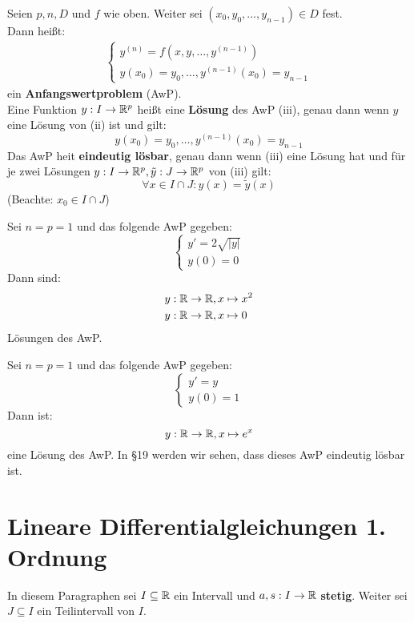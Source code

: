 \documentclass[a4paper,twoside,DIV15,BCOR12mm,chapterprefix=true,headings=twolinechapter]{scrbook}
\begin{document}
\begin{definition}
Seien $p,n,D$ und $f$ wie oben. Weiter sei $(x_0,y_0,\ldots,y_{n-1})\in D$ fest.\\
Dann heißt:
\begin{align*}
\begin{cases}y^{(n)}=f(x,y,\ldots,y^{(n-1)})\\
y(x_0)=y_0,\ldots,y^{(n-1)}(x_0)=y_{n-1}\end{cases}\tag{iii}
\end{align*}
ein \textbf{Anfangswertproblem} (AwP).\\
Eine Funktion $y:I\to\mathbb{R}^p$ heißt eine \textbf{Lösung} des AwP (iii), genau dann
wenn $y$ eine Lösung von (ii) ist und gilt:
\[y(x_0)=y_0,\ldots,y^{(n-1)}(x_0)=y_{n-1}\]
Das AwP heit \textbf{eindeutig lösbar}, genau dann wenn (iii) eine Lösung hat und
für je zwei Lösungen $y:I\to\mathbb{R}^p,\tilde y:J\to\mathbb{R}^p$ von (iii) gilt:
\[\forall x\in I\cap J:y(x)=\tilde y(x)\]
(Beachte: $x_0\in I\cap J$)
\end{definition}

\begin{beispiele}
\item Sei $n=p=1$ und das folgende AwP gegeben:
\[\begin{cases}
y'=2\sqrt{|y|}\\
y(0)=0
\end{cases}\]
Dann sind:
\begin{align*}
&y:\mathbb{R}\to\mathbb{R}, x\mapsto x^2\\
&y:\mathbb{R}\to\mathbb{R}, x\mapsto 0
\end{align*}
Lösungen des AwP.
\item Sei $n=p=1$ und das folgende AwP gegeben:
\[\begin{cases}
y'=y\\
y(0)=1
\end{cases}\]
Dann ist:
\[y:\mathbb{R}\to\mathbb{R}, x\mapsto e^x\]
eine Lösung des AwP. In §19 werden wir sehen, dass dieses AwP eindeutig lösbar ist.
\end{beispiele}

\chapter{Lineare Differentialgleichungen 1. Ordnung}
In diesem Paragraphen sei $I\subseteq\mathbb{R}$ ein Intervall und $a,s:I\to\mathbb{R}$ \textbf{stetig}.
Weiter sei $J\subseteq I$ ein Teilintervall von $I$.
\end{document}
